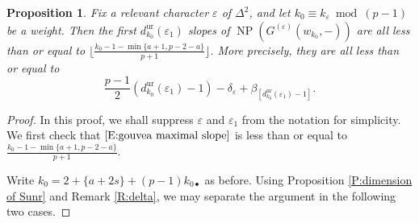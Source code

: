 \documentclass[12pt]{amsart}
\newtheorem{proposition}[subsection]{Proposition}
\theoremstyle{definition}
\numberwithin{equation}{subsection}
\DeclareMathOperator{\NP}{NP}
\newcommand{\unr}{\mathrm{ur}}
\begin{document}
\begin{proposition}
\label{P:gouvea k-1/p+1 conjecture}
Fix a relevant character $\varepsilon$ of $\Delta^2$, and let $k_0 \equiv k_\varepsilon \bmod{(p-1)}$ be a weight. Then the first $d_{k_0}^\unr(\varepsilon_1)$ slopes of $\NP(G^{(\varepsilon)}(w_{k_0}, -))$ are all less than or equal to $\big\lfloor\frac{k_0-1-\min\{a+1,p-2-a\}}{p+1}\big\rfloor$. More precisely, they are all less than or equal to
\begin{equation}
\label{E:gouvea maximal slope}
\frac{p-1}2(d_{k_0}^\unr(\varepsilon_1)-1)-\delta_\varepsilon + \beta_{[d_{k_0}^\unr(\varepsilon_1)-1]}.
\end{equation}
\end{proposition}
\begin{proof}
In this proof, we shall suppress $\varepsilon$ and $\varepsilon_1$ from the notation for simplicity.
We first check that $\eqref{E:gouvea maximal slope}$ is less than or equal to $\frac{k_0-1-\min\{a+1,p-2-a\}}{p+1}$.

Write $k_0 = 2+\{a+2s\} + (p-1)k_{0\bullet}$ as before. Using Proposition \ref{P:dimension of Sunr} and Remark \ref{R:delta}, we may separate the argument in the following two cases.


\end{proof}
\end{document}
